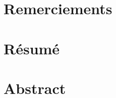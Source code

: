 \documentclass[a4paper,11pt,twoside]{memoir}
\begin{document}
\MakeUGthesePDG

\chapter*{Remerciements}
\chapter*{R\'{e}sum\'{e}}
\chapter*{Abstract}



\dominitoc
\setcounter{tocdepth}{1}
\tableofcontents

\newcommand{\glos}[1]{\gls{#1}*}
\newcommand{\gloss}[1]{\glspl{#1}*}
\newcommand{\Glos}[1]{\Gls{#1}*}
\newcommand{\Gloss}[1]{\Glspl{#1}*}


\sloppy 













\glsaddall
\printglossaries



\appendix

\end{document}
